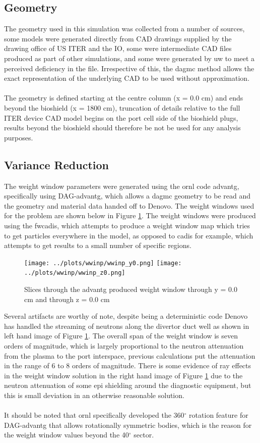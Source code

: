 \documentclass[12pt]{article}
\begin{document}
\subsection{Geometry}
The geometry used in this simulation was collected from a number of sources,
some models were generated directly from CAD drawings supplied by the
drawing office of US ITER and the IO, some were intermediate CAD files produced
as part of other simulations, and some were generated by \gls{uw} to meet a
perceived deficiency in the file. Irrespective of this, the \gls{dagmc} method
allows the exact representation of the underlying CAD to be used without
approximation.
\\
\\
The geometry is defined starting at the centre column (x = 0.0 cm) and ends
beyond the bioshield (x = 1800 cm), truncation of details relative to the full
ITER device CAD model begins on the port cell side of the bioshield plugs,
results beyond the bioshield should therefore be not be used for any
analysis purposes. 
\subsection{Variance Reduction}
The weight window parameters were generated using the \gls{ornl} code
\gls{advantg}, specifically using DAG-\gls{advantg}, which allows a
\gls{dagmc} geometry to be read and the geometry and material data handed off to
Denovo. The weight windows used for the problem are shown below in Figure
\ref{fig:wwinp}. The weight windows were produced using the \gls{fwcadis},
which attempts to produce a weight window map which tries to get particles
everywhere in the model, as opposed to \gls{cadis} for example, which
attempts to get results to a small number of specific regions.
\begin{figure}[ht!]
  \centering
  \texttt{[image: ../plots/wwinp/wwinp\_y0.png]}
  \texttt{[image: ../plots/wwinp/wwinp\_z0.png]}
  \caption{Slices through the \gls{advantg} produced weight window through y =
  0.0 cm and through z = 0.0 cm}
  \label{fig:wwinp}
\end{figure}
Several artifacts are worthy of note, despite being a deterministic code Denovo
has handled the streaming of neutrons along the divertor duct well as shown in
left hand image of Figure \ref{fig:wwinp}. The overall span of the weight window
is seven orders of magnitude, which is largely proportional to the neutron
attenuation from the plasma to the port interspace, previous calculations put
the attenuation in the range of 6 to 8 orders of magnitude. There is some
evidence of ray effects in the weight window solution in the right hand image
of Figure \ref{fig:wwinp} due to the neutron attenuation of some \gls{epi}
shielding around the diagnostic equipment, but this is small deviation in an
otherwise reasonable solution.
\\
\\
It should be noted that \gls{ornl} specifically developed the 360$^{\circ}$
rotation feature for DAG-\gls{advantg} that allows rotationally symmetric
bodies, which is the reason for the weight window values beyond the
40$^{\circ}$ sector.
\end{document}
